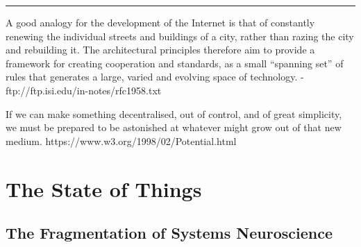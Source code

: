 \documentclass{article}
\begin{document}



\begin{center}\rule{0.5\linewidth}{0.5pt}\end{center}

\newpage


\begin{leftbar}
A good analogy for the development of the Internet is that of constantly
renewing the individual streets and buildings of a city, rather than
razing the city and rebuilding it. The architectural principles
therefore aim to provide a framework for creating cooperation and
standards, as a small ``spanning set'' of rules that generates a large,
varied and evolving space of technology. -
ftp://ftp.isi.edu/in-notes/rfc1958.txt
\end{leftbar}

\begin{leftbar}
If we can make something decentralised, out of control, and of great
simplicity, we must be prepared to be astonished at whatever might grow
out of that new medium. https://www.w3.org/1998/02/Potential.html
\end{leftbar}



\hypertarget{the-state-of-things}{%
\section{The State of Things}\label{the-state-of-things}}

\hypertarget{the-fragmentation-of-systems-neuroscience}{%
\subsection{The Fragmentation of Systems
Neuroscience}\label{the-fragmentation-of-systems-neuroscience}}
\end{document}
